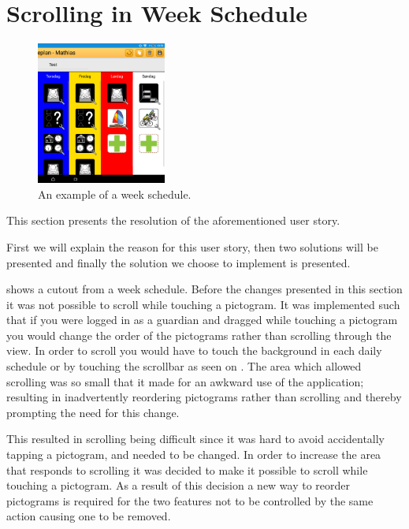 \section{Scrolling in Week Schedule}
\begin{center}
\end{center}

\begin{figure}
    \vspace{-8mm}
    \centering
        \includegraphics[width=0.38\textwidth]{figures/img/screenshots/weekplan_schedule.png}
    \caption{An example of a week schedule.}\label{fig:weekschedule}
    \vspace{-18mm}
\end{figure}

This section presents the resolution of the aforementioned user story.

First we will explain the reason for this user story, then two solutions will be presented and finally the solution we choose to implement is presented.

 shows a cutout from a week schedule.
Before the changes presented in this section it was not possible to scroll while touching a pictogram.
It was implemented such that if you were logged in as a guardian and dragged while touching a pictogram you would change the order of the pictograms rather than scrolling through the view.
In order to scroll you would have to touch the background in each daily schedule or by touching the scrollbar as seen on .
The area which allowed scrolling was so small that it made for an awkward use of the application; resulting in inadvertently reordering pictograms rather than scrolling and thereby prompting the need for this change.

This resulted in scrolling being difficult since it was hard to avoid accidentally tapping a pictogram, and needed to be changed.
In order to increase the area that responds to scrolling  it was decided to make it possible to scroll while touching a pictogram.
As a result of this decision a new way to reorder pictograms is required for the two features not to be controlled by the same action causing one to be removed.

